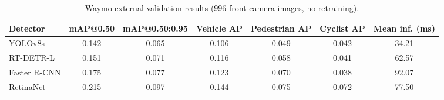 \begin{table}[t]
    \centering
    \caption{Waymo external-validation results (996 front-camera images, no retraining).}
    \label{tab:waymo_results}
    \begin{tabular}{lcccccc}
        \toprule
        Detector & mAP@0.50 & mAP@0.50:0.95 & Vehicle AP & Pedestrian AP & Cyclist AP & Mean inf. (ms) \\
        \midrule
        YOLOv8s & 0.142 & 0.065 & 0.106 & 0.049 & 0.042 & 34.21 \\
        RT-DETR-L & 0.151 & 0.071 & 0.116 & 0.058 & 0.041 & 62.57 \\
        Faster R-CNN & 0.175 & 0.077 & 0.123 & 0.070 & 0.038 & 92.07 \\
        RetinaNet & 0.215 & 0.097 & 0.144 & 0.075 & 0.072 & 77.50 \\
        \bottomrule
    \end{tabular}
\end{table}
